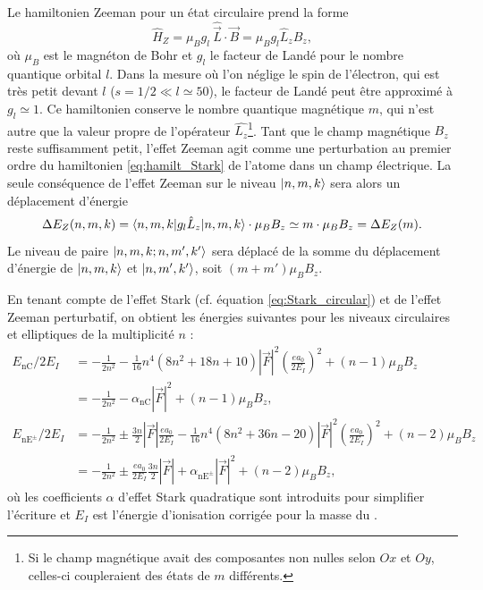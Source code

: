 Le hamiltonien Zeeman pour un état circulaire prend la forme%
\begin{equation}
\label{eq:H_Zeeman}
\hat{H}_Z = \mu_B g_l~\hat{\vec{L}}\cdot\vec{B} = \mu_B g_l\hat{L}_zB_z,
\end{equation}
où $\mu_B$ est le magnéton de Bohr et $g_l$ le facteur de Landé pour le nombre quantique orbital $l$.
Dans la mesure où l'on néglige le spin de l'électron, qui est très petit devant $l$ ($s=1/2 \ll l\simeq 50$), le facteur de Landé peut être approximé à $g_l \simeq 1$.
Ce hamiltonien conserve le nombre quantique magnétique $m$, qui n'est autre que la valeur propre de l'opérateur $\hat{L_z}$\footnote{
Si le champ magnétique avait des composantes non nulles selon $Ox$ et $Oy$, celles-ci coupleraient des états de $m$ différents.}.
Tant que le champ magnétique $B_z$ reste suffisamment petit, l'effet Zeeman agit comme une perturbation au premier ordre du hamiltonien \eqref{eq:hamilt_Stark} de l'atome dans un champ électrique.
La seule conséquence de l'effet Zeeman sur le niveau $\ket{n,m,k}$ sera alors un déplacement d'énergie
\begin{equation}
\label{eq:Zeeman_shift}
\Delta E_Z (n,m,k) = \braket{n,m,k|g_l \hat{L}_z | n,m,k}\cdot \mu_B B_z \simeq m\cdot \mu_B B_z = \Delta E_Z (m).
\end{equation}
Le niveau de paire $\ket{n,m,k ; n,m',k'}$ sera déplacé de la somme du déplacement d'énergie de $\ket{n,m,k}$ et $\ket{n,m',k'}$, soit $(m+m')\mu_B B_z$.

En tenant compte de l'effet Stark (cf. équation \eqref{eq:Stark_circular}) et de l'effet Zeeman perturbatif, on obtient les énergies suivantes pour les niveaux circulaires et elliptiques de la multiplicité $n$ :
\begin{equation}
\label{eq:ener_nC_ZeeStark}
\begin{aligned}
E_{\mathrm{nC}}/2E_I &= -\frac{1}{2n^2} - \frac{1}{16}n^4(8n^2+18n+10)|\vec{F}|^2 \left(\frac{ea_0}{2E_I} \right)^2 + (n-1)\mu_B B_z \\
&= -\frac{1}{2n^2} - \alpha_{\mathrm{nC}}|\vec{F}|^2 + (n-1)\mu_B B_z ,\\
E_{\mathrm{nE^{\pm}}}/2E_I &= -\frac{1}{2n^2} \pm \frac{3n}{2}|\vec{F}|\frac{ea_0}{2E_I} - \frac{1}{16}n^4(8n^2+36n-20)|\vec{F}|^2\left(\frac{ea_0}{2E_I} \right)^2 + (n-2)\mu_B B_z \\
&= -\frac{1}{2n^2} \pm \frac{ea_0}{2E_I}\frac{3n}{2}|\vec{F}| +\alpha_{\mathrm{nE^{\pm}}}|\vec{F}|^2 + (n-2)\mu_B B_z,
\end{aligned}
\end{equation}
où les coefficients $\alpha$ d'effet Stark quadratique sont introduits pour simplifier l'écriture et $E_I$ est l'énergie d'ionisation corrigée pour la masse du .

